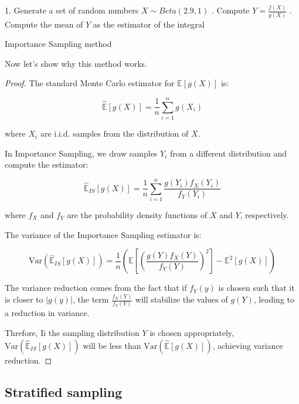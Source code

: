 \documentclass{report}
\begin{document}
\begin{center}
	\begin{minipage}{0.7\linewidth} %
		\begin{algorithm}[H]
			1. Generate a set of random numbers \(X \sim Beta(2.9,1)\) . Compute \(Y = \frac{f(X)}{g(X)}\) . Compute the mean of \(Y\) as the estimator of the integral \;
			\caption{Importance Sampling method} %
			\label{alg:importancesampling}   %
		\end{algorithm}
	\end{minipage}
\end{center}

Now let's show why this method works.

\begin{proof}
	The standard Monte Carlo estimator for \( \mathbb{E}[g(X)] \) is:
	
	\[ \hat{\mathbb{E}}[g(X)] = \frac{1}{n} \sum_{i=1}^{n} g(X_i) \]
	
	where \( X_i \) are i.i.d. samples from the distribution of \( X \).
	
	In Importance Sampling, we draw samples \( Y_i \) from a different distribution and compute the estimator:

	\[ \hat{\mathbb{E}}_{IS}[g(X)] = \frac{1}{n} \sum_{i=1}^{n} \frac{g(Y_i) f_X(Y_i)}{f_Y(Y_i)} \]
	   
	where \( f_X \) and \( f_Y \) are the probability density functions of \( X \) and \( Y \), respectively.
	
	The variance of the Importance Sampling estimator is:
	   
	\[ \mathrm{Var}(\hat{\mathbb{E}}_{IS}[g(X)]) = \frac{1}{n} \left( \mathbb{E}\left[ \left( \frac{g(Y) f_X(Y)}{f_Y(Y)} \right)^2 \right] - \mathbb{E}^2[g(X)] \right) \]
	   
	The variance reduction comes from the fact that if \( f_Y(y) \) is chosen such that it is closer to \( |g(y)| \), the term \( \frac{f_X(Y)}{f_Y(Y)} \) will stabilize the values of \( g(Y) \), leading to a reduction in variance. 
	   
	Threfore, Ii the sampling distribution \( Y \) is chosen appropriately, \( \mathrm{Var}(\hat{\mathbb{E}}_{IS}[g(X)]) \) will be less than \( \mathrm{Var}(\hat{\mathbb{E}}[g(X)]) \), achieving variance reduction.
\end{proof}


\subsection{Stratified sampling}
\label{sec:stratified_sampling}
\end{document}
